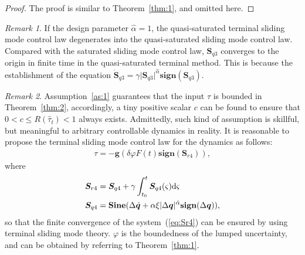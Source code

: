 \documentclass[3p]{elsarticle}
\theoremstyle{plain}
\theoremstyle{remark}
\newtheorem{myrem}{Remark}
\begin{document}
\begin{proof}
The proof is similar to Theorem~\ref{thm:1}, and omitted here.
\end{proof}
\begin{myrem}
If the design parameter $\hat\alpha = 1$, the quasi-saturated terminal sliding mode control law degenerates into the quasi-saturated sliding mode control law. Compared with the saturated sliding mode control law, $\bm S_{q3}$ converges to the origin in finite time in the quasi-saturated terminal method. This is because the establishment of the equation $\dot {\bm S}_{q3} = \gamma\vert \bm S_{q3}\vert^{\hat\alpha} \mathbf{ sign}(\bm S_{q3})$.
\end{myrem}
\begin{myrem}
Assumption~\ref{as:1} guarantees that the input $\tau$ is bounded in Theorem~\ref{thm:2}, accordingly, a tiny positive scalar $c$ can be found to ensure that $0<c\le R(\hat\tau_t)<1$ always exists. Admittedly, such kind of assumption is skillful, but meaningful to arbitrary controllable dynamics in reality. It is reasonable to propose the terminal sliding mode control law for the dynamics as follows:
\begin{align}
\tau = -\bm{g}(\delta\varphi F(t) \mathbf{sign}(\bm S_{r4})),
\end{align}
where
\begin{align}
\begin{split}
\bm S_{r4} &= \bm S_{q4}+\gamma\int^t_{t_0}\bm S_{q4}(\varsigma) \rm{d}\it{\varsigma}\\
\bm S_{q4} &= \mathbf{Sine}(\Delta \dot {\bm q}+\alpha\xi\vert\Delta \bm q\vert^{\hat\alpha}\mathbf{sign}(\Delta \bm q)),\label{eq:Sr4}
\end{split}
\end{align}
so that the finite convergence of the system~(\ref{eq:Sr4}) can be ensured by using terminal sliding mode theory. $\varphi$ is the boundedness of the lumped uncertainty, and can be obtained by referring to Theorem~\ref{thm:1}.
\end{myrem}
\end{document}
